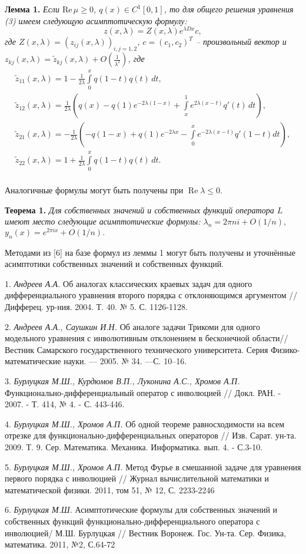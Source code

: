 \textbf{Лемма 1.} {\it Если $\mathrm{Re\,} \mu \geqslant 0$,  $q (x)\in
C^1[0,1]$, то для общего решения уравнения (3) имеем следующую
асимптотическую формулу:
$$ z(x, \lambda )=Z(x,  \lambda) e^{\lambda  {D}x}c, $$
где $ Z(x,  \lambda)= (z_{ij}(x,  \lambda))_{i,j=1,2}$,  $c=(c_1,
c_2)^T$ -- произвольный вектор и $z_{kj}(x,
\lambda)=\widetilde{z}_{kj}(x,\lambda)+ O\left( \frac1{ \lambda^2}
\right)$, где
$$\begin{array}{l} \widetilde{z}_{11}(x, \lambda)=1 -\frac1{2 \lambda}\int\limits_0^x q(1-t) q(t)\, dt, \\
\widetilde{z}_{12}(x, \lambda)=\frac1{2 \lambda}\left(q(x)- q(1)
e^{-2\lambda (1- x)}+ \int\limits_x^1 e^{2\lambda (x- t)} q'(t)\,
dt\right)\!,\\
 \widetilde{z}_{21}(x, \lambda)= {-}\frac1{2 \lambda}\!\left({-}q(1{-}x){+}q(1)
e^{-2\lambda  x}{-}\int\limits_0^x e^{-2\lambda (x{-}t)} q'(1{-}t)  dt\right)\!\!,\\
%
\widetilde{z}_{22}(x, \lambda)=1 +\frac1{2 \lambda}\int\limits_0^x
q(1-t) q(t)\, dt. \end{array}$$} \\
Аналогичные
формулы могут быть получены при $\operatorname{Re}\lambda \leqslant 0$.

\textbf{Теорема 1.} {\it Для собственных значений и собственных
функций оператора $L$ имеют место следующие асимптотические формулы:
${{\lambda }_{n}}=2\pi ni+O(1/n),$ ${{y}_{n}}\left( x
\right)={{e}^{2\pi ix}}+O(1/n).$}

Методами из [6] на базе формул из леммы 1  могут быть получены и
уточнённые асимптотики собственных значений и собственных функций.

\litlist

1. {\it Андреев А.А.} Об аналогах классических краевых задач для одного
дифференциального уравнения второго порядка с отклоняющимся
аргументом // Дифферец. ур-ния. 2004. Т. 40. № 5. С. 1126-1128.

2. {\it Андреев  А.А., Саушкин И.Н.} Об аналоге задачи Трикоми для одного
модельного уравнения с инволютивным отклонением в бесконечной
области// Вестник Самарского государственного технического
университета. Серия Физико-математические науки. --- 2005. № 34.
---С. 10--16.

3. {\it Бурлуцкая М.Ш., Курдюмов В.П.,  Луконина А.С.,  Хромов А.П.}
Функционально-дифференциальный оператор с инволюцией  // Докл. РАН.
- 2007. - Т. 414, № 4. - С. 443-446.

4. {\it Бурлуцкая М.Ш., Хромов А.П.}  Об одной теореме равносходимости  на
всем отрезке для функционально-диффе\-рен\-циаль\-ных операторов //
Изв. Сарат. ун-та. 2009. Т. 9. Сер. Математика. Механика.
Информатика. вып. 4. - С.3-10.

5. {\it Бурлуцкая М.Ш., Хромов А.П.} Метод Фурье в  смешанной задаче для
уравнения первого порядка   с инволюцией // Журнал вычислительной
математики и математической физики. 2011, том 51, № 12, С. 2233-2246

6. {\it Бурлуцкая М.Ш.} Асимптотические формулы для собственных значений и
собственных функций функционально-дифференциального оператора с
инволюцией/ М.Ш. Бурлуцкая // Вестник Воронеж. Гос. Ун-та. Сер.
Физика, математика. 2011, №2, С.64-72
